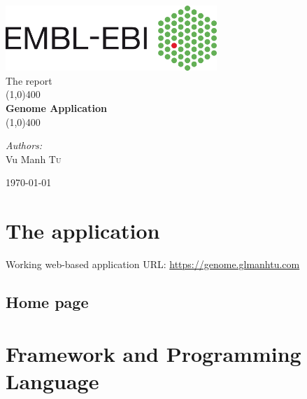 \documentclass[a4paper,12pt]{article}
\begin{document}
\begin{titlepage}
	\begin{center}
\includegraphics[width=0.6\textwidth]{images/Ebi_official_logo}\\[1cm]

{\Large The report}\\[0.5cm]	
	
	\line(1,0){400}\\[0.2in]
	\huge{\bfseries Genome Application}\\
	\line(1,0){400}\\[1.5cm]
	\noindent	
	

	
		\begin{center} \large
    	\emph{Authors:}\\
    	Vu Manh \textsc{Tu}\\
		\end{center}

\vfill

{\large \today}
	\end{center}
\end{titlepage}

\tableofcontents
\thispagestyle{empty}
\clearpage

\section{The application}
Working web-based application URL: \url{https://genome.glmanhtu.com}
\subsection{Home page}


\section{Framework and Programming Language}
\end{document}
